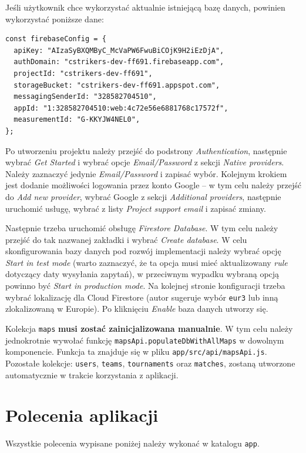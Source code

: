 \documentclass[shortabstract]{iithesis}
\theoremstyle{definition} \newtheorem{definition}{Definicja}[]
\theoremstyle{remark} \newtheorem{remark}[definition]{Observation}
\theoremstyle{plain} \newtheorem{theorem}[definition]{Theorem}
\theoremstyle{plain} \newtheorem{lemma}[definition]{Lemma}
\begin{document}
Jeśli użytkownik chce wykorzystać aktualnie istniejącą bazę danych, powinien wykorzystać poniższe dane:
\begin{verbatim}
const firebaseConfig = {
  apiKey: "AIzaSyBXQMByC_McVaPW6FwuBiCOjK9H2iEzDjA",
  authDomain: "cstrikers-dev-ff691.firebaseapp.com",
  projectId: "cstrikers-dev-ff691",
  storageBucket: "cstrikers-dev-ff691.appspot.com",
  messagingSenderId: "328582704510",
  appId: "1:328582704510:web:4c72e56e6881768c17572f",
  measurementId: "G-KKYJW4NEL0",
};
\end{verbatim}

Po utworzeniu projektu należy przejść do podstrony \textit{Authentication}, następnie wybrać \textit{Get Started} i wybrać opcje \textit{Email/Password} z sekcji \textit{Native providers}. Należy zaznaczyć jedynie \textit{Email/Password} i zapisać wybór. Kolejnym krokiem jest dodanie możliwości logowania przez konto Google -- w tym celu należy przejść do \textit{Add new provider}, wybrać Google z sekcji \textit{Additional providers}, następnie uruchomić usługę, wybrać z listy \textit{Project support email} i zapisać zmiany.

Następnie trzeba uruchomić obsługę \textit{Firestore Database}. W tym celu należy przejść do tak nazwanej zakładki i wybrać \textit{Create database}. W celu skonfigurowania bazy danych pod rozwój implementacji należy wybrać opcję \textit{Start in test mode} (warto zaznaczyć, że ta opcja musi mieć aktualizowany \textit{rule} dotyczący daty wysyłania zapytań), w przeciwnym wypadku wybraną opcją powinno być \textit{Start in production mode}. Na kolejnej stronie konfiguracji trzeba wybrać lokalizację dla Cloud Firestore (autor sugeruje wybór \texttt{eur3} lub inną zlokalizowaną w Europie). Po kliknięciu \textit{Enable} baza danych utworzy się.

Kolekcja \texttt{maps} \textbf{musi zostać zainicjalizowana manualnie}. W tym celu należy jednokrotnie wywołać funkcję \texttt{mapsApi.populateDbWithAllMaps} w dowolnym komponencie. Funkcja ta znajduje się w pliku \texttt{app/src/api/mapsApi.js}. Pozostałe kolekcje: \texttt{users}, \texttt{teams}, \texttt{tournaments} oraz \texttt{matches}, zostaną utworzone automatycznie w trakcie korzystania z aplikacji.

\section{Polecenia aplikacji}
Wszystkie polecenia wypisane poniżej należy wykonać w katalogu \texttt{app}.
\end{document}
